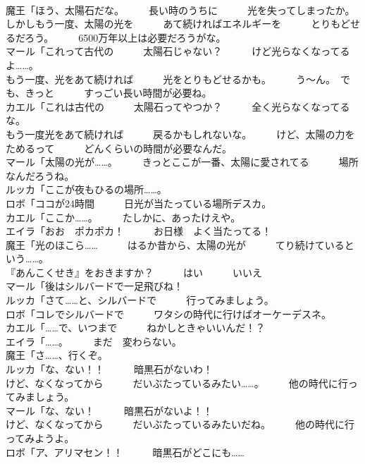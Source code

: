 \documentclass[8pt]{extreport}
\begin{document}
\begin{CJK}{UTF8}{min}
\\	魔王「ほう、太陽石だな。　　　長い時のうちに　　　光を失ってしまったか。	
\\	しかしもう一度、太陽の光を　　　あて続ければエネルギーを　　　とりもどせるだろう。　　　6500万年以上は必要だろうがな。	
\\	マール「これって古代の　　　太陽石じゃない？　　　けど光らなくなってるよ……。	
\\	もう一度、光をあて続ければ　　　光をとりもどせるかも。　　　う～ん。　でも、きっと　　　すっごい長い時間が必要ね。	
\\	カエル「これは古代の　　　太陽石ってやつか？　　　全く光らなくなってるな。	
\\	もう一度光をあて続ければ　　　戻るかもしれないな。　　　けど、太陽の力をためるって　　　どんくらいの時間が必要なんだ。	
\\	マール「太陽の光が……。　　　きっとここが一番、太陽に愛されてる　　　場所なんだろうね。	
\\	ルッカ「ここが夜もひるの場所……。	
\\	ロボ「ココが24時間　　　日光が当たっている場所デスカ。	
\\	カエル「ここか……。　　　たしかに、あったけえや。	
\\	エイラ「おお　ポカポカ！　　　お日様　よく当たってる！	
\\	魔王「光のほこら……　　　はるか昔から、太陽の光が　　　てり続けているという……。	
\\	『あんこくせき』をおきますか？　　　はい　　　いいえ	
\\	マール「後はシルバードで一足飛びね！	
\\	ルッカ「さて……と、シルバードで　　　行ってみましょう。	
\\	ロボ「コレでシルバードで　　　ワタシの時代に行けばオーケーデスネ。	
\\	カエル「……で、いつまで　　　ねかしときゃいいんだ！？	
\\	エイラ「……。　　　まだ　変わらない。	
\\	魔王「さ……、行くぞ。	
\\	ルッカ「な、ない！！　　　暗黒石がないわ！	
\\	けど、なくなってから　　　だいぶたっているみたい……。　　　他の時代に行ってみましょう。	
\\	マール「な、ない！　　　暗黒石がないよ！！	
\\	けど、なくなってから　　　だいぶたっているみたいだね。　　　他の時代に行ってみようよ。	
\\	ロボ「ア、アリマセン！！　　　暗黒石がどこにも……	

\end{CJK}
\end{document}

